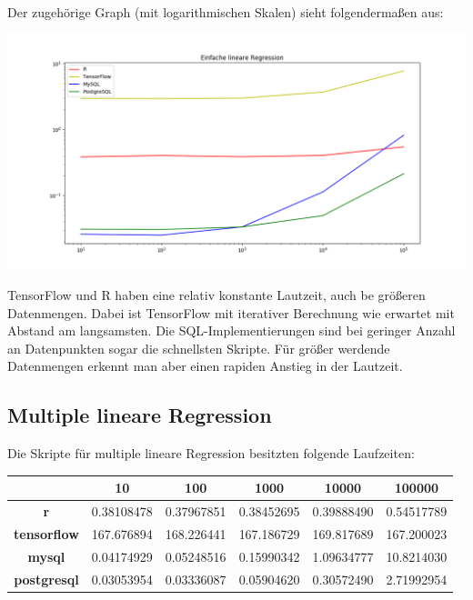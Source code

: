 Der zugehörige Graph (mit logarithmischen Skalen) sieht folgendermaßen aus:

\includegraphics[width=\textwidth]{simpleLinearRegressionBenchmark}

TensorFlow und R haben eine relativ konstante Lautzeit, auch be größeren Datenmengen. Dabei ist TensorFlow mit iterativer Berechnung wie erwartet mit Abstand am langsamsten. Die SQL-Implementierungen sind bei geringer Anzahl an Datenpunkten sogar die schnellsten Skripte. Für größer werdende Datenmengen erkennt man aber einen rapiden Anstieg in der Lautzeit.

\subsection{Multiple lineare Regression}
\label{subsection:4:2:2}

Die Skripte für multiple lineare Regression besitzten folgende Laufzeiten:

\begin{center}
  \begin{tabular}{|c|c|c|c|c|c|}\hline
    & \textbf{10} & \textbf{100} & \textbf{1000} & \textbf{10000} & \textbf{100000} \\ \hline
    \textbf{r} & 0.38108478 & 0.37967851 & 0.38452695 & 0.39888490 & 0.54517789 \\ \hline
    \textbf{tensorflow} & 167.676894 & 168.226441 & 167.186729 & 169.817689 & 167.200023 \\ \hline
    \textbf{mysql} & 0.04174929 & 0.05248516 & 0.15990342 & 1.09634777 & 10.8214030 \\ \hline
    \textbf{postgresql} & 0.03053954 & 0.03336087 & 0.05904620 & 0.30572490 & 2.71992954 \\ \hline
  \end{tabular}
\end{center}

